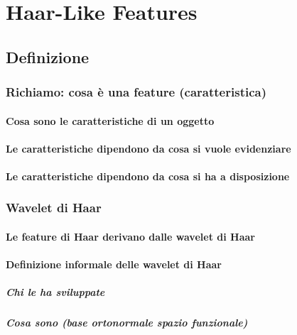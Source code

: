 

\chapter{Haar-Like Features}
\label{chap:features}
    \section{Definizione}
    \label{sec:haar_features_definition}
        \subsection{Richiamo: cosa è una feature (caratteristica)}
            \subsubsection{Cosa sono le caratteristiche di un oggetto}
            \subsubsection{Le caratteristiche dipendono da cosa si vuole evidenziare}
            \subsubsection{Le caratteristiche dipendono da cosa si ha a disposizione}
        \subsection{Wavelet di Haar}
            \subsubsection{Le feature di Haar derivano dalle wavelet di Haar}
            \subsubsection{Definizione informale delle wavelet di Haar}
                \paragraph{Chi le ha sviluppate}
                \paragraph{Cosa sono (base ortonormale spazio funzionale)}
